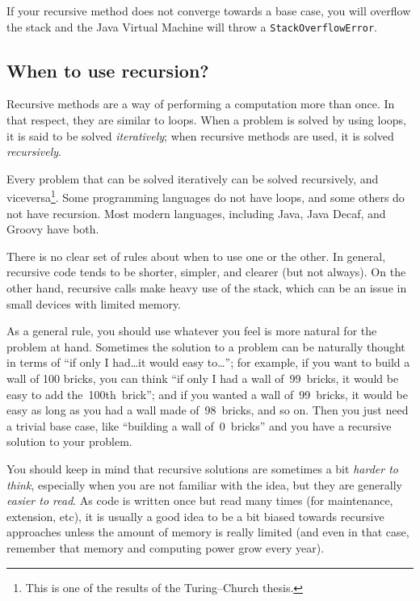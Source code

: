 If your recursive method does not converge towards a base case, you
will overflow the stack and the Java Virtual Machine will throw a
\verb+StackOverflowError+. 

\subsection{When to use recursion?}
\label{sec:when-use-recursion}

Recursive methods are a way of performing a computation more than
once. In that respect, they are similar to loops. When a problem is
solved by using loops, it is said to be solved \emph{iteratively};
when recursive methods are used, it is solved \emph{recursively}. 

Every problem that can be solved iteratively can be solved
recursively, and viceversa\footnote{This is one of the results of the
 Turing--Church thesis.}. Some programming languages do not have
loops, and some others do not have recursion. Most modern languages,
including Java, Java Decaf, and Groovy have both. 

There is no clear set of rules about when to use one or the other. In
general, recursive code tends to be shorter, simpler, and clearer (but
not always). On the other hand, recursive calls make heavy use of the
stack, which can be an issue in small devices with limited memory. 

As a general rule, you should use whatever you feel is more natural
for the problem at hand. Sometimes the solution to a problem can be
naturally thought in terms of ``if only I had\ldots it would easy
to\ldots''; for example, if you want to build a wall of 100 bricks,
you can think ``if only I had a wall of~99~bricks, it would be easy
to add the~100th~brick''; and if you wanted a wall of~99~bricks, it
would be easy as long as you had a wall made of~98~bricks, and so
on. Then you just need a trivial base case, like ``building a wall 
of~0~bricks'' and you have a recursive solution to your problem. 

You should keep in mind that recursive
solutions are sometimes a bit \emph{harder to think}, 
especially when you are not familiar
with the idea, but they are generally \emph{easier to read}. 
As code is written once but read many times 
(for maintenance, extension, etc), it is usually a good
idea to be a bit biased towards recursive approaches unless the amount
of memory is really limited (and even in that case, remember that
memory and computing power grow every year). 







